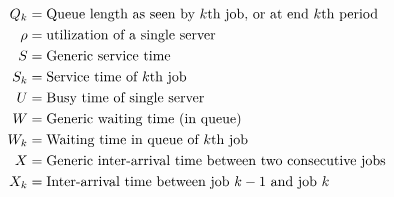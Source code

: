 \documentclass[stochastic-or.tex]{subfiles}
\begin{document}
\begin{align*}
 Q_k &= \text{Queue length as seen by  $k$th job, or at  end  $k$th period} \\
 \rho &= \text{utilization of a single server} \\
 S &= \text{Generic service time} \\
 S_k &= \text{Service time of  $k$th job} \\
 U &= \text{Busy time of single server} \\
 W &= \text{Generic waiting time (in  queue)} \\
 W_{k} &= \text{Waiting time in  queue of~$k$th job} \\
 X &= \text{Generic inter-arrival time between two consecutive jobs} \\
 X_k &= \text{Inter-arrival time between job $k-1$ and job~$k$} \\
\end{align*}



\end{document}
